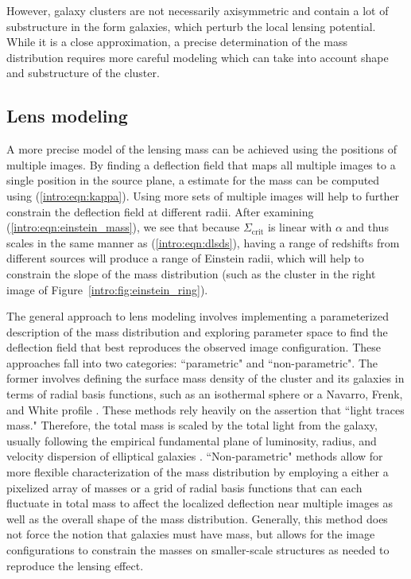 However, galaxy clusters are not necessarily axisymmetric and contain a lot of substructure in the form galaxies, which perturb the local lensing potential. While it is a close approximation, a precise determination of the mass distribution requires more careful modeling which can take into account shape and substructure of the cluster.

\subsection{Lens modeling}

A more precise model of the lensing mass can be achieved using the positions of multiple images. By finding a deflection field that maps all multiple images to a single position in the source plane, a estimate for the mass can be computed using (\ref{intro:eqn:kappa}). Using more sets of multiple images will help to further constrain the deflection field at different radii. After examining (\ref{intro:eqn:einstein_mass}), we see that because $\Sigma_\mathrm{crit}$ is linear with $\alpha$ and thus scales in the same manner as (\ref{intro:eqn:dlsds}), having a range of redshifts from different sources will produce a range of Einstein radii, which will help to constrain the slope of the mass distribution (such as the cluster in the right image of Figure~\ref{intro:fig:einstein_ring}).

The general approach to lens modeling involves implementing a parameterized description of the mass distribution and exploring parameter space to find the deflection field that best reproduces the observed image configuration. These approaches fall into two categories: ``parametric" and ``non-parametric". The former involves defining the surface mass density of the cluster and its galaxies in terms of radial basis functions, such as an isothermal sphere or a Navarro, Frenk, and White profile \citep[NFW; ][]{Navarro:1997qa}. These methods rely heavily on the assertion that ``light traces mass." Therefore, the total mass is scaled by the total light from the galaxy, usually following the empirical fundamental plane of luminosity, radius, and velocity dispersion of elliptical galaxies \citep{Gudehus:1973kq}. ``Non-parametric" methods allow for more flexible characterization of the mass distribution by employing a either a pixelized array of masses or a grid of radial basis functions that can each fluctuate in total mass to affect the localized deflection near multiple images as well as the overall shape of the mass distribution. Generally, this method does not force the notion that galaxies must have mass, but allows for the image configurations to constrain the masses on smaller-scale structures as needed to reproduce the lensing effect.

